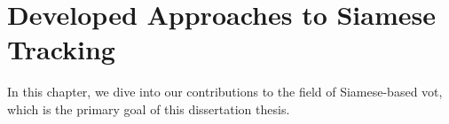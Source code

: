 \chapter{Developed Approaches to Siamese Tracking}
\label{chap:DevelopedSiameseTrackingApproaches}

In this chapter, we dive into our contributions to the field of Siamese-based \gls{vot}, which is the primary goal of this dissertation thesis.







